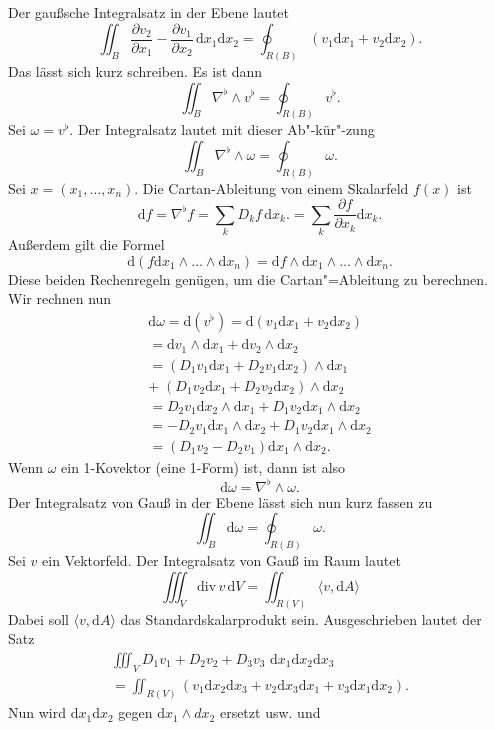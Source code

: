 \documentclass[a4paper,10pt,fleqn,twocolumn,twoside]{article}
\begin{document}
Der gaußsche Integralsatz in der Ebene lautet
\[\iint_B \frac{\partial v_2}{\partial x_1}
- \frac{\partial v_1}{\partial x_2}\,\mathrm dx_1\mathrm dx_2
= \oint_{R(B)} (v_1\mathrm dx_1+v_2\mathrm dx_2).\] 
Das lässt sich kurz schreiben. Es ist dann
\[\iint_B \nabla^\flat\wedge v^\flat = \oint_{R(B)}  v^\flat.\]
Sei $\omega= v^\flat$.
Der Integralsatz lautet mit dieser Ab"-kür"-zung
\[\iint_B \nabla^\flat\wedge\omega
= \oint_{R(B)} \omega.\]
%
Sei $x=(x_1,\ldots,x_n)$.
Die Cartan-Ableitung von einem Skalarfeld $f(x)$ ist
\[\mathrm df = \nabla^\flat f
= \sum_{k} D_k f\,\mathrm dx_k.
= \sum_{k} \frac{\partial f}{\partial x_k}\mathrm dx_k.\]
Außerdem gilt die Formel
\[\mathrm d(f\mathrm dx_1\wedge\ldots\wedge\mathrm dx_n)
= \mathrm df\wedge\mathrm dx_1\wedge\ldots\wedge\mathrm dx_n.\]
Diese beiden Rechenregeln genügen, um die Cartan"=Ableitung
zu berechnen. Wir rechnen nun
\begin{gather*}
\mathrm d\omega
= \mathrm d(v^\flat)
= \mathrm d(v_1\mathrm dx_1+v_2\mathrm dx_2)\\
= \mathrm dv_1\wedge\mathrm dx_1+\mathrm dv_2\wedge\mathrm dx_2\\
= (D_1v_1\mathrm dx_1+D_2v_1\mathrm dx_2)\wedge\mathrm dx_1\\
+\;(D_1v_2\mathrm dx_1+D_2v_2\mathrm dx_2)\wedge\mathrm dx_2\\
= D_2v_1\mathrm dx_2\wedge\mathrm dx_1
+ D_1v_2\mathrm dx_1\wedge\mathrm dx_2\\
= -D_2v_1\mathrm dx_1\wedge\mathrm dx_2
+ D_1v_2\mathrm dx_1\wedge\mathrm dx_2\\
= (D_1v_2-D_2v_1)\mathrm dx_1\wedge\mathrm dx_2.
\end{gather*}
Wenn $\omega$ ein 1-Kovektor (eine 1-Form) ist, dann ist also
\[\mathrm d\omega
= \nabla^\flat\wedge\omega.\]
Der Integralsatz von Gauß in der Ebene lässt sich nun kurz fassen zu
\[\iint_B \mathrm d\omega
= \oint_{R(B)}\omega.\]
%
Sei $v$ ein Vektorfeld. Der Integralsatz von Gauß im Raum lautet
\[\iiint_V \mathrm{div}\,v\,\mathrm dV
= \iint_{R(V)} \langle v,\mathrm dA\rangle\]
Dabei soll $\langle v,\mathrm dA\rangle$ das Standardskalarprodukt
sein. Ausgeschrieben lautet der Satz
\begin{gather*}
\iiint_V D_1v_1+D_2v_2+D_3v_3\,\,\mathrm dx_1\mathrm dx_2\mathrm dx_3\\
= \iint_{R(V)}(v_1\mathrm dx_2\mathrm dx_3+v_2\mathrm dx_3\mathrm dx_1
+v_3 \mathrm dx_1\mathrm dx_2).
\end{gather*}
Nun wird $\mathrm dx_1\mathrm dx_2$ gegen
$\mathrm dx_1\wedge dx_2$ ersetzt usw. und
\end{document}
